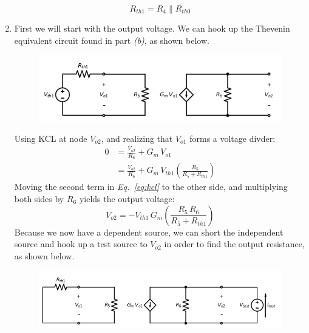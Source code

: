 \documentclass[12pt, fleqn]{article}
\begin{document}
\begin{enumerate}[label=(\alph*)]
{        \begin{equation*}
            \boxed{R_{th1} = R_4 \parallel R_{th0}}
        \end{equation*}
        }
    \newpage\noindent
    \item
        {
        First we will start with the output voltage.  We can hook up the Thevenin equivalent circuit found in part \textit{(b)}, as shown below.
        \begin{figure}[H]
        \centering
        \includegraphics[scale=0.75]{p1c2.png}
        \label{fig:full_thev}
        \end{figure}
        Using KCL at node $V_{o2}$, and realizing that $V_{o1}$ forms a voltage divder:
        \begin{align}
            0 &= \frac{V_{o2}}{R_6} + G_m\,V_{o1}\\[0.35cm]
            &= \frac{V_{o2}}{R_6} + G_m\,V_{th1} \left(\frac{R_5}{R_5 + R_{th1}}\right)
            \label{eq:kcl}
        \end{align}
        Moving the second term in \emph{Eq.~\ref{eq:kcl}} to the other side, and multiplying both sides by $R_6$ yields the output voltage:
        \begin{equation*}
            \boxed{V_{o2} = -V_{th1}\,G_m\left(\frac{R_5\,R_6}{R_5 + R_{th1}}\right)}
        \end{equation*}
        Because we now have a dependent source, we can short the independent source and hook up a test source to $V_{o2}$ in order to find the output resistance, as shown below.
        \begin{figure}[H]
        \centering
        \includegraphics[scale=0.7]{p1c3.png}

\end{figure}}
\end{enumerate}
\end{document}
